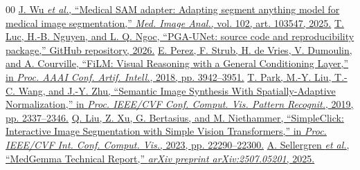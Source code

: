 \begin{thebibliography}{00}
 \href{https://doi.org/10.1016/j.media.2025.103547}{J. Wu \textit{et al.}, ``Medical SAM adapter: Adapting segment anything model for medical image segmentation,'' \textit{Med. Image Anal.}, vol. 102, art. 103547, 2025.}
 \href{https://github.com/ThongLuc2k3/PGA_Unet2D}{T. Luc, H.-B. Nguyen, and L. Q. Ngoc, ``PGA-UNet: source code and reproducibility package,'' GitHub repository, 2026.}
 \href{https://arxiv.org/abs/1709.07871}{E. Perez, F. Strub, H. de Vries, V. Dumoulin, and A. Courville, ``FiLM: Visual Reasoning with a General Conditioning Layer,'' in \textit{Proc. AAAI Conf. Artif. Intell.}, 2018, pp. 3942--3951.}
 \href{https://openaccess.thecvf.com/content_CVPR_2019/html/Park_Semantic_Image_Synthesis_With_Spatially-Adaptive_Normalization_CVPR_2019_paper.html}{T. Park, M.-Y. Liu, T.-C. Wang, and J.-Y. Zhu, ``Semantic Image Synthesis With Spatially-Adaptive Normalization,'' in \textit{Proc. IEEE/CVF Conf. Comput. Vis. Pattern Recognit.}, 2019, pp. 2337--2346.}
 \href{https://openaccess.thecvf.com/content/ICCV2023/html/Liu_SimpleClick_Interactive_Image_Segmentation_with_Simple_Vision_Transformers_ICCV_2023_paper.html}{Q. Liu, Z. Xu, G. Bertasius, and M. Niethammer, ``SimpleClick: Interactive Image Segmentation with Simple Vision Transformers,'' in \textit{Proc. IEEE/CVF Int. Conf. Comput. Vis.}, 2023, pp. 22290--22300.}
 \href{https://arxiv.org/abs/2507.05201}{A. Sellergren \textit{et al.}, ``MedGemma Technical Report,'' \textit{arXiv preprint arXiv:2507.05201}, 2025.}
\end{thebibliography}
